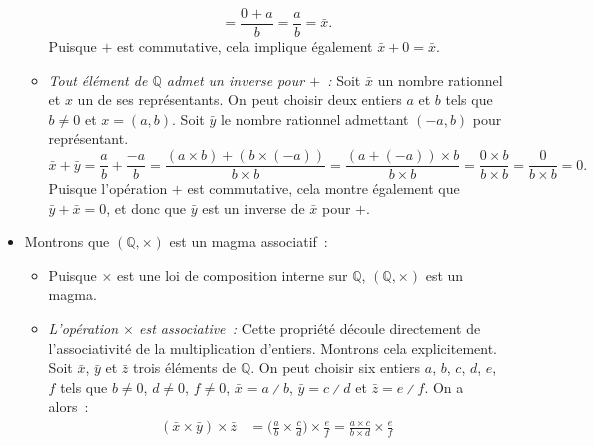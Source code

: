 \begin{itemize}[nosep]
\begin{itemize}[nosep]
\begin{equation*}
                        = \frac{0 + a}{b}
                        = \frac{a}{b}
                        = \bar{x}.
                \end{equation*}
                Puisque $+$ est commutative, cela implique également $\bar{x} + 0 = \bar{x}$.
            \item \emph{Tout élément de $\mathbb{Q}$ admet un inverse pour $+$ :} 
                Soit $\bar{x}$ un nombre rationnel et $x$ un de ses représentants. 
                On peut choisir deux entiers $a$ et $b$ tels que $b \neq 0$ et $x = (a, b)$.
                Soit $\bar{y}$ le nombre rationnel admettant $(-a, b)$ pour représentant.
                \begin{equation*}
                    \bar{x} + \bar{y} = \frac{a}{b} + \frac{-a}{b}
                        = \frac{(a \times b) + (b \times (-a))}{b \times b}
                        = \frac{(a + (-a)) \times b}{b \times b}
                        = \frac{0 \times b}{b \times b}
                        = \frac{0}{b \times b}
                        = 0 .
                \end{equation*}
                Puisque l'opération $+$ est commutative, cela montre également que $\bar{y} + \bar{x} = 0$, et donc que $\bar{y}$ est un inverse de $\bar{x}$ pour $+$.
                \end{itemize}
    \item Montrons que $(\mathbb{Q}, \times)$ est un magma associatif :
        \begin{itemize}[nosep]
            \item Puisque $\times$ est une loi de composition interne sur $\mathbb{Q}$, $(\mathbb{Q}, \times)$ est un magma.
            \item \emph{L'opération $\times$ est associative :} 
                Cette propriété découle directement de l'associativité de la multiplication d'entiers. 
                Montrons cela explicitement. 
                Soit $\bar{x}$, $\bar{y}$ et $\bar{z}$ trois éléments de $\mathbb{Q}$. 
                On peut choisir six entiers $a$, $b$, $c$, $d$, $e$, $f$ tels que $b \neq 0$, $d \neq 0$, $f \neq 0$, $\bar{x} = a \divslash b$, $\bar{y} = c \divslash d$ et $\bar{z} = e \divslash f$.
                On a alors : 
                \begin{equation*} \begin{aligned}
                    (\bar{x} \times \bar{y}) \times \bar{z} 
                    & = \Big( \frac{a}{b} \times \frac{c}{d} \Big) \times \frac{e}{f}
                    = \frac{a \times c}{b \times d} \times \frac{e}{f}

\end{aligned}
\end{equation*}
\end{itemize}
\end{itemize}
